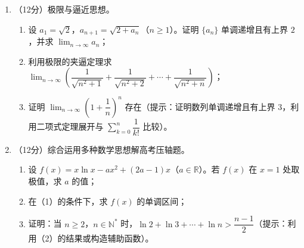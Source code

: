 \documentclass[12pt, a4paper]{ctexart}
\begin{document}
\begin{enumerate}[resume]
\item （12分）极限与逼近思想。

\begin{enumerate}[label=(\arabic*)]
    \item 设 $a_1=\sqrt{2}$，$a_{n+1}=\sqrt{2+a_n}$（$n\geq 1$）。证明 $\{a_n\}$ 单调递增且有上界 $2$，并求 $\displaystyle\lim_{n\to\infty}a_n$；
    \item 利用极限的夹逼定理求 $\displaystyle\lim_{n\to\infty}\left(\dfrac{1}{\sqrt{n^2+1}}+\dfrac{1}{\sqrt{n^2+2}}+\cdots+\dfrac{1}{\sqrt{n^2+n}}\right)$；
    \item 证明 $\displaystyle\lim_{n\to\infty}\left(1+\dfrac{1}{n}\right)^n$ 存在（提示：证明数列单调递增且有上界 $3$，利用二项式定理展开与 $\displaystyle\sum_{k=0}^{n}\dfrac{1}{k!}$ 比较）。
\end{enumerate}

\item （12分）综合运用多种数学思想解高考压轴题。

\begin{enumerate}[label=(\arabic*)]
    \item 设 $f(x)=x\ln x-ax^2+(2a-1)x$（$a\in\mathbb{R}$）。若 $f(x)$ 在 $x=1$ 处取极值，求 $a$ 的值；
    \item 在（1）的条件下，求 $f(x)$ 的单调区间；
    \item 证明：当 $n\geq 2$，$n\in\mathbb{N}^*$ 时，$\ln 2+\ln 3+\cdots+\ln n>\dfrac{n-1}{2}$（提示：利用（2）的结果或构造辅助函数）。
\end{enumerate}

\end{enumerate}
\end{document}
